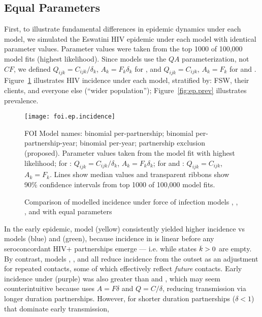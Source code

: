 \subsection{Equal Parameters}\label{exp.ep}
First, to illustrate fundamental differences in epidemic dynamics under each model,
we simulated the Eswatini HIV epidemic under each model with identical parameter values.
Parameter values were taken from
the top 1000 of 100,000 model  fits (highest likelihood).
Since models  use the $QA$ parameterization, not $CF$, we defined
$Q_{ijk} = C_{ijk} / \delta_k$, $A_{k} = F_{k} \delta_k$ for , and
$Q_{ijk} = C_{ijk}$, $A_{k} = F_{k}$ for  and .
Figure~\ref{fig:ep.inc} illustrates HIV incidence under each model,
stratified by: FSW, their clients, and everyone else (``wider population'');
Figure~\ref{fig:ep.prev} illustrates prevalence.
\begin{figure}[h]
  \centerline{\texttt{[image: foi.ep.incidence]}}
  \caption{Comparison of modelled incidence under force of infection models
    , , , and  with equal parameters}
  \label{fig:ep.inc}
  \floatfoot
  FOI Model names:
   binomial per-partnership;
   binomial per-partnership-year;
   binomial per-year;
   partnership exclusion (proposed).
  Parameter values taken from the  model fit with highest likelihood;
  for : $Q_{ijk} = C_{ijk} / \delta_k$, $A_{k} = F_{k} \delta_k$;
  for  and : $Q_{ijk} = C_{ijk}$, $A_{k} = F_{k}$.
  Lines show median values and transparent ribbons show 90\% confidence intervals
  from top 1000 of 100,000  model fits.
\end{figure}
\par
In the early epidemic, model  (yellow) consistently yielded higher incidence
vs models  (blue) and  (green),
because incidence in  is linear before any seroconcordant HIV+ partnerships emerge
--- i.e. while states $\k > 0$ are empty.
By contrast, models , , and  all reduce incidence from the outset
as an adjustment for repeated contacts, some of which effectively reflect \emph{future} contacts.
Early incidence under  (purple) was also greater than  and ,
which may seem counterintuitive because  uses $A = F \delta$ and $Q = C / \delta$,
reducing transmission via longer duration partnerships.
However, for shorter duration partnerships ($\delta < 1$) that dominate early transmission,
